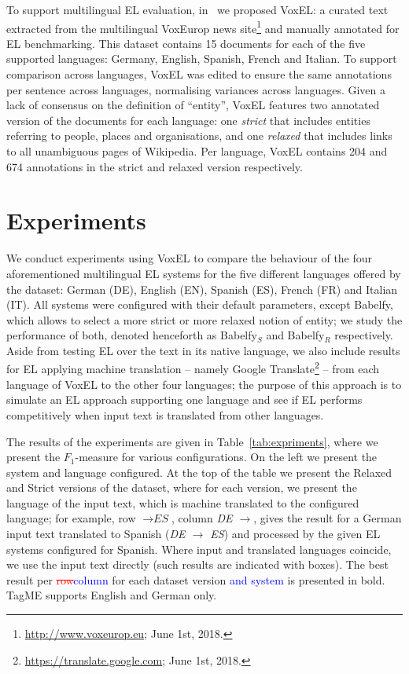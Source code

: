 \documentclass{llncs}
\begin{document}
To support multilingual EL evaluation, in~\cite{ourISWC} we proposed VoxEL: a curated text extracted from the multilingual VoxEurop news site\footnote{\url{http://www.voxeurop.eu}; June 1st, 2018.} and manually annotated for EL benchmarking. This dataset contains 15 documents for each of the five supported languages: Germany, English, Spanish, French and Italian. To support comparison across languages, VoxEL was edited to ensure the same annotations per sentence across languages, normalising variances across languages. Given a lack of consensus on the definition of ``entity'', VoxEL features two annotated version of the documents for each language: one \textit{strict} that includes entities referring to people, places and organisations, and one \textit{relaxed} that includes links to all unambiguous pages of Wikipedia. Per language, VoxEL contains 204 and 674 annotations in the strict and relaxed version respectively.

\section{Experiments}

We conduct experiments using VoxEL to compare the behaviour of the four aforementioned multilingual EL systems for the five different languages offered by the dataset: German (DE), English (EN), Spanish (ES), French (FR) and Italian (IT). All systems were configured with their default parameters, except Babelfy, which allows to select a more strict or more relaxed notion of entity; we study the performance of both, denoted henceforth as Babelfy$_S$ and Babelfy$_R$ respectively. Aside from testing EL over the text in its native language, we also include results for EL applying machine translation -- namely Google Translate\footnote{\url{https://translate.google.com}; June 1st, 2018.} -- from each language of VoxEL to the other four languages; the purpose of this approach is to simulate an EL approach supporting one language and see if EL performs competitively when input text is translated from other languages. 

The results of the experiments are given in Table~\ref{tab:expriments}, where we present the $F_1$-measure for various configurations. On the left we present the system and language configured. At the top of the table we present the Relaxed and Strict versions of the dataset, where for each version, we present the language of the input text, which is machine translated to the configured language; for example, row $\rightarrow \textit{ES}$, column \textit{DE $\rightarrow$}, gives the result for a German input text translated to Spanish (\textit{DE $\rightarrow$ ES}) and processed by the given EL systems configured for Spanish. Where input and translated languages coincide, we use the input text directly (such results are indicated with boxes). The best result per \textcolor{red}{\st{row}}\textcolor{blue}{column} for each dataset version \textcolor{blue}{and system} is presented in bold. TagME supports English and German only.
\end{document}
